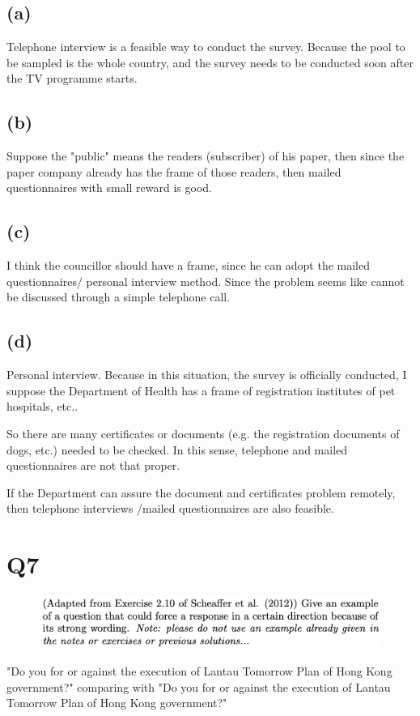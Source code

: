 \documentclass[12pt]{article}%
\begin{document}
\subsection{(a)}
Telephone interview is a feasible way to conduct the survey. Because the pool to be sampled 
is the whole country, and the survey needs to be conducted soon after the TV programme starts.

\subsection{(b)}
Suppose the "public" means the readers (subscriber) of his paper, 
then since the paper company already has the frame of those readers, then mailed questionnaires
with small reward is good.

\subsection{(c)}
I think the councillor should have a frame, since he can adopt the mailed questionnaires/
personal interview method. Since the problem seems like cannot be discussed through a simple
telephone call.


\subsection{(d)}
Personal interview. Because in this situation, the survey is officially conducted, 
I suppose the Department of Health has a frame of registration institutes of pet hospitals, etc..

So there are many certificates or documents (e.g. the registration documents of dogs, etc.)
needed to be checked. In this sense, telephone and mailed questionnaires are not that proper.

If the Department can assure the document and certificates problem remotely, then telephone
interviews /mailed questionnaires are also feasible.


\newpage
\section{Q7}
\begin{figure}[htp]
    \includegraphics[width = 14cm]{img/Q7.png}
\end{figure}

"Do you for or against the execution of Lantau Tomorrow Plan of Hong Kong government?" comparing with 
"Do you for or against the execution of Lantau Tomorrow Plan of Hong Kong government?"
\end{document}
